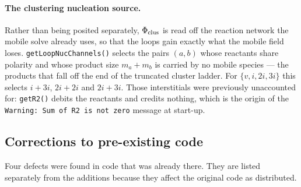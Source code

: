 \documentclass[11pt]{article}
\newcommand{\code}[1]{\texttt{\small #1}}
\begin{document}
\paragraph*{The clustering nucleation source.} Rather than being posited
separately, $\Phi_{\rm clus}$ is read off the reaction network the mobile solve
already uses, so that the loops gain exactly what the mobile field loses.
\code{getLoopNucChannels()} selects the pairs $(a,b)$ whose reactants share
polarity and whose product size $m_a+m_b$ is carried by no mobile species --- the
products that fall off the end of the truncated cluster ladder. For
$\{v,i,2i,3i\}$ this selects $i+3i$, $2i+2i$ and $2i+3i$. Those interstitials
were previously unaccounted for: \code{getR2()} debits the reactants and credits
nothing, which is the origin of the \code{Warning: Sum of R2 is not zero} message
at start-up.

\subsection{Corrections to pre-existing code}

Four defects were found in code that was already there. They are listed
separately from the additions because they affect the original code as
distributed.
\end{document}
